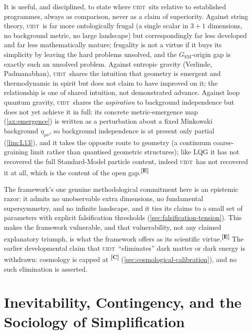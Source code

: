 \documentclass[12pt,a4paper,twoside]{article}
\theoremstyle{plain}
\theoremstyle{definition}
\theoremstyle{remark}
\newcommand{\UIDT}{\textsc{uidt}}
\newcommand{\catmark}[1]{\textsuperscript{\textsf{\textbf{[#1]}}}}
\begin{document}
It is useful, and disciplined, to state where \UIDT\ sits relative to established programmes, always as comparison, never as a claim of superiority. Against string theory, \UIDT\ is far more ontologically frugal (a single scalar in $3+1$ dimensions, no background metric, no large landscape) but correspondingly far less developed and far less mathematically mature; frugality is not a virtue if it buys its simplicity by leaving the hard problems unsolved, and the $G_{\mathrm{SM}}$-origin gap is exactly such an unsolved problem. Against entropic gravity (Verlinde, Padmanabhan), \UIDT\ shares the intuition that geometry is emergent and thermodynamic in spirit but does not claim to have improved on it; the relationship is one of shared intuition, not demonstrated advance. Against loop quantum gravity, \UIDT\ shares the \emph{aspiration} to background independence but does not yet achieve it in full: its concrete metric-emergence map (\cref{ax:emergence}) is written as a perturbation about a fixed Minkowski background $\eta_{\mu\nu}$, so background independence is at present only partial (\cref{lim:L13}), and it takes the opposite route to geometry (a continuum coarse-graining limit rather than quantised geometric structures); like LQG it has not recovered the full Standard-Model particle content, indeed \UIDT\ has not recovered it at all, which is the content of the open gap.\catmark{E}

The framework's one genuine methodological commitment here is an epistemic razor: it admits no unobservable extra dimensions, no fundamental supersymmetry, and no infinite landscape, and it ties its claims to a small set of parameters with explicit falsification thresholds (\cref{sec:falsification-tension}). This makes the framework vulnerable, and that vulnerability, not any claimed explanatory triumph, is what the framework offers as its scientific virtue.\catmark{E} The earlier developmental claim that \UIDT\ ``eliminates'' dark matter or dark energy is withdrawn: cosmology is capped at \catmark{C} (\cref{sec:cosmological-calibration}), and no such elimination is asserted.

\section{Inevitability, Contingency, and the Sociology of Simplification}
\label{sec:inevitability-sociology}
\end{document}

